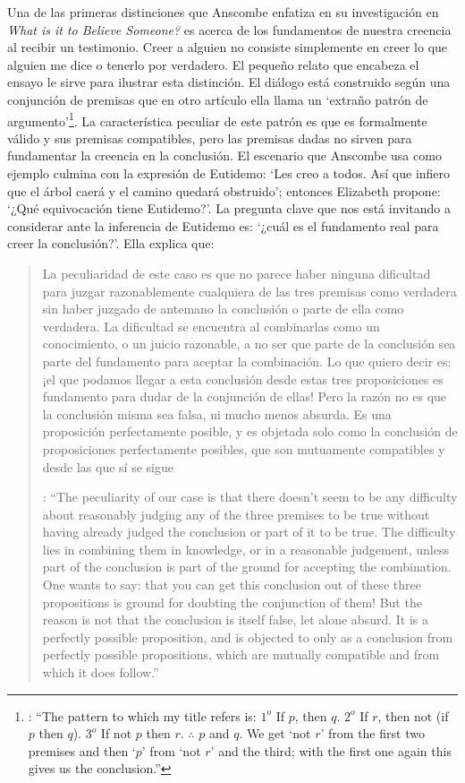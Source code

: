 Una de las primeras distinciones que Anscombe enfatiza en su investigación en \emph{What is it to Believe Someone?} es acerca de los fundamentos de nuestra creencia al recibir un testimonio. Creer a alguien no consiste simplemente en creer lo que alguien me dice o tenerlo por verdadero. El pequeño relato que encabeza el ensayo le sirve para ilustrar esta distinción. El diálogo está construido según una conjunción de premisas que en otro artículo ella llama un `extraño patrón de argumento'\footnote{\cite[Cf.~][299]{anscombe2015logic:qpa}: \enquote{The pattern to which my title refers is: $1^{o}$ If $p$, then $q$. $2^{o}$ If $r$, then not (if $p$ then $q$). $3^{o}$ If not $p$ then $r$. $\mathbf{\therefore}$ $p$ and $q$. We get `not $r$' from the first two premises and then `$p$' from `not $r$' and the third; with the first one again this gives us the conclusion.}}. La característica peculiar de este patrón es que es formalmente válido y sus premisas compatibles, pero las premisas dadas no sirven para fundamentar la creencia en la conclusión. El escenario que Anscombe usa como ejemplo culmina con la expresión de Eutidemo: \enquote*{Les creo a todos. Así que infiero que el árbol caerá y el camino quedará obstruido}; entonces Elizabeth propone: \enquote*{¿Qué equivocación tiene Eutidemo?}. La pregunta clave que nos está invitando a considerar ante la inferencia de Eutidemo es: \enquote*{¿cuál es el fundamento real para creer la conclusión?}. Ella explica que: \blockquote[{\cite[301]{anscombe2015logic:qpa}}: \enquote{The peculiarity of our case is that there doesn't seem to be any difficulty about reasonably judging any of the three premises to be true without having already judged the conclusion or part of it to be true. The difficulty lies in combining them in knowledge, or in a reasonable judgement, unless part of the conclusion is part of the ground for accepting the combination. One wants to say: that you can get this conclusion out of these three propositions is ground for doubting the conjunction of them! But the reason is not that the conclusion is itself false, let alone absurd. It is a perfectly possible proposition, and is objected to only as a conclusion from perfectly possible propositions, which are mutually compatible and from which it does follow.}]{La peculiaridad de este caso es que no parece haber ninguna dificultad para juzgar razonablemente cualquiera de las tres premisas como verdadera sin haber juzgado de antemano la conclusión o parte de ella como verdadera. La dificultad se encuentra al combinarlas como un conocimiento, o un juicio razonable, a no ser que parte de la conclusión sea parte del fundamento para aceptar la combinación. Lo que quiero decir es: ¡el que podamos llegar a esta conclusión desde estas tres proposiciones es fundamento para dudar de la conjunción de ellas! Pero la razón no es que la conclusión misma sea falsa, ni mucho menos absurda. Es una proposición perfectamente posible, y es objetada solo como la conclusión de proposiciones perfectamente posibles, que son mutuamente compatibles y desde las que sí se sigue}.

